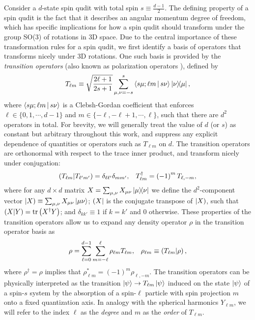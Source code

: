 \documentclass[notitlepage,twocolumn]{revtex4-2}
\newcommand{\f}[2]{\dfrac{#1}{#2}} %
\newcommand{\p}[1]{\left(#1\right)} %
\newcommand{\bk}{\Braket} %
\renewcommand{\set}[1]{\{#1\}} %
\def\obra#1{\mathinner{({#1}|}}
\def\oket#1{\mathinner{|{#1})}}
\def\obk#1{\mathinner{({#1})}}
\begin{document}
Consider a $d$-state spin qudit with total spin $s\equiv\frac{d-1}{2}$.
The defining property of a spin qudit is the fact that it describes an angular momentum degree of freedom, which has specific implications for how a spin qudit should transform under the group SO(3) of rotations in 3D space.
Due to the central importance of these transformation rules for a spin qudit, we first identify a basis of operators that transforms nicely under 3D rotations.
One such basis is provided by the {\it transition operators} (also known as polarization operators \cite{kryszewski2006positivity, bertlmann2008bloch}), defined by
\begin{align}
  T_{\ell m} \equiv \sqrt{\f{2\ell+1}{2s+1}} \sum_{\mu,\nu=-s}^s
  \bk{s\mu;\ell m|s\nu} \op{\nu}{\mu},
  \label{eq:trans_op}
\end{align}
where $\bk{s\mu;\ell m|s\nu}$ is a Clebsh-Gordan coefficient that enforces $\ell\in\set{0,1,\cdots,d-1}$ and $m\in\set{-\ell,-\ell+1,\cdots,\ell}$, such that there are $d^2$ operators in total.
For brevity, we will generally treat the value of $d$ (or $s$) as constant but arbitrary throughout this work, and suppress any explicit dependence of quantities or operators such as $T_{\ell m}$ on $d$.
The transition operators are orthonormal with respect to the trace inner product, and transform nicely under conjugation:
\begin{align}
  \obk{T_{\ell m }|T_{\ell'm'}}
  = \delta_{\ell\ell'} \delta_{mm'},
  &&
  T_{\ell m}^\dag = \p{-1}^m T_{\ell,-m},
\end{align}
where for any $d\times d$ matrix $X=\sum_{\mu,\nu} X_{\mu\nu} \op{\mu}{\nu}$ we define the $d^2$-component vector $\oket{X} \equiv \sum_{\mu,\nu} X_{\mu\nu} \ket{\mu\nu}$; $\obra{X}$ is the conjugate transpose of $\oket{X}$, such that $\obk{X|Y}=\tr\p{X^\dag Y}$; and $\delta_{kk'}\equiv 1$ if $k=k'$ and $0$ otherwise.
These properties of the transition operators allow us to expand any density operator $\rho$ in the transition operator basis as
\begin{align}
  \rho = \sum_{\ell=0}^{d-1} \sum_{m=-\ell}^\ell \rho_{\ell m} T_{\ell m},
  &&
  \rho_{\ell m} \equiv \obk{T_{\ell m}|\rho},
  \label{eq:trans_state}
\end{align}
where $\rho^\dag=\rho$ implies that $\rho_{\ell m}^*=\p{-1}^m\rho_{\ell,-m}$.
The transition operators can be physically interpreted as the transition $\ket\psi\to T_{\ell m}\ket\psi$ induced on the state $\ket\psi$ of a spin-$s$ system by the absorption of a spin-$\ell$ particle with spin projection $m$ onto a fixed quantization axis.
In analogy with the spherical harmonics $Y_{\ell m}$, we will refer to the index $\ell$ as the {\it degree} and $m$ as the {\it order} of $T_{\ell m}$.
\end{document}

